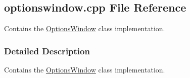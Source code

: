 \hypertarget{a00019}{}\subsection{optionswindow.\+cpp File Reference}
\label{a00019}


Contains the \hyperlink{a00006}{Options\+Window} class implementation.  




\subsubsection{Detailed Description}
Contains the \hyperlink{a00006}{Options\+Window} class implementation. 


